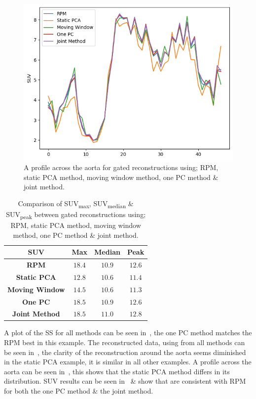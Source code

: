     \begin{figure}
        \centering
        \includegraphics[width=0.5\linewidth]{figures/profile_pca.png}
        \captionsetup{singlelinecheck=false, justification=centering}
        \caption{A profile across the aorta for gated reconstructions using; \gls{RPM}, static \gls{PCA} method, moving window method, one \gls{PC} method \& joint method.}
        \label{fig:profile}
    \end{figure}
    
    \begin{table}
        \centering
        \captionsetup{singlelinecheck=false, justification=centering}
        \caption{Comparison of \gls{SUV}\textsubscript{max}, \gls{SUV}\textsubscript{median} \& \gls{SUV}\textsubscript{peak} between gated reconstructions using; \gls{RPM}, static \gls{PCA} method, moving window method, one \gls{PC} method \& joint method.}
        
        \resizebox*{0.5\linewidth}{!}
        {
            \begin{tabular}{||c|ccc||}
                \hline
                \textbf{\gls{SUV}} & \textbf{Max} & \textbf{Median} & \textbf{Peak} \\
                \hline
                \textbf{\gls{RPM}}          & $18.4$ & $10.9$ & $12.6$ \\
                \hline
                \textbf{Static \gls{PCA}}   & $12.8$ & $10.6$ & $11.4$ \\
                \textbf{Moving Window}      & $14.5$ & $10.6$ & $11.3$ \\
                \textbf{One \gls{PC}}       & $18.5$ & $10.9$ & $12.6$ \\
                \textbf{Joint Method}       & $18.5$ & $11.0$ & $12.8$ \\
                \hline
            \end{tabular}
        }
        \label{tab:suv}
    \end{table}
    
    A plot of the \gls{SS} for all methods can be seen in~, the one \gls{PC} method matches the \gls{RPM} best in this example. The reconstructed data, using  from all methods can be seen in~, the clarity of the reconstruction around the aorta seems diminished in the static \gls{PCA} example, it is similar in all other examples. A profile across the aorta can be seen in~, this shows that the static \gls{PCA} method differs in its distribution. \gls{SUV} results can be seen in~ \& show that  are consistent with \gls{RPM} for both the one \gls{PC} method \& the joint method.
    
